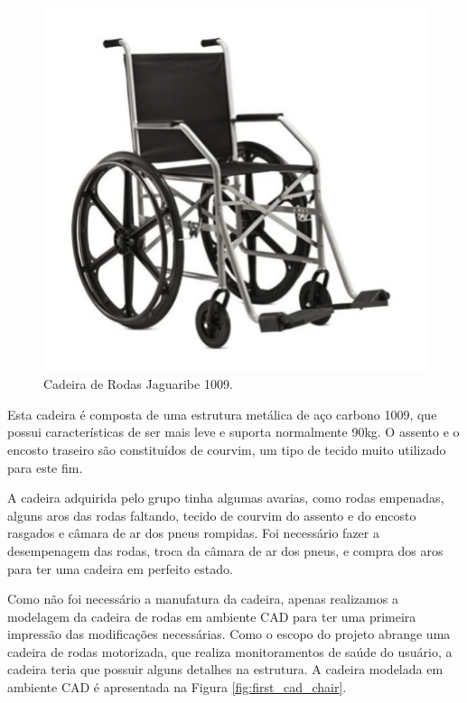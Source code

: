 \begin{figure}[!htb]
    \begin{center}
        \includegraphics{figuras/original_chair.png}
    \end{center}
    \caption{Cadeira de Rodas Jaguaribe 1009.}
    \label{fig:original_chair}
\end{figure}

Esta cadeira é composta de uma estrutura metálica de aço carbono 1009, que
possui características de ser mais leve e suporta normalmente 90kg. O assento
e o encosto traseiro são constituídos de courvim, um tipo de tecido muito
utilizado para este fim.

A cadeira adquirida pelo grupo tinha algumas avarias, como rodas empenadas,
alguns aros das rodas faltando, tecido de courvim do assento e do encosto
rasgados e câmara de ar dos pneus rompidas. Foi necessário fazer a desempenagem
das rodas, troca da câmara de ar dos pneus, e compra dos aros para ter uma
cadeira em perfeito estado.

Como não foi necessário a manufatura da cadeira, apenas realizamos a modelagem
da cadeira de rodas em ambiente CAD para ter uma primeira impressão das
modificações necessárias. Como o escopo do projeto abrange
uma cadeira de rodas motorizada, que realiza monitoramentos de saúde do usuário, a
cadeira teria que possuir alguns detalhes na estrutura. A cadeira modelada em
ambiente CAD é apresentada na Figura \ref{fig:first_cad_chair}.

